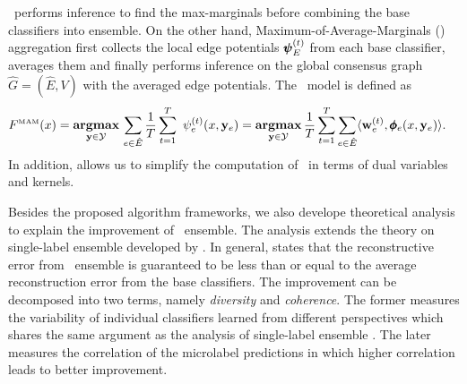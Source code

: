 {%
\amm\ performs inference to find the max-marginals before combining the base classifiers into ensemble. 
On the other hand, Maximum-of-Average-Marginals (\mam) aggregation first collects the local edge potentials $\pmb \psi_E^{(t)}$ from each base classifier, averages them and finally performs inference on the global consensus graph $\hat{G}=(\hat{E},V)$ with the averaged edge potentials.
The \mam\ model is defined as
\begin{align*}
	F^{\text{\tiny MAM}}(x) &= \underset{\vy \in \Ycal }{\argmax}\,\sum_{e\in \hat{E}}\frac{1}{T}\sum_{t=1}^{T}\ \psi^{(t)}_e(x,\vy_e)
	= \underset{\vy \in \Ycal}{\argmax}\, \frac{1}{T} \sum_{t=1}^T \sum_{e\in \hat{E}} \ip{\vw_e^{(t)}}{\phib_e(x,\vy_e)}. %
\end{align*}
In addition,  allows us to simplify the computation of \mam\ in terms of dual variables and kernels.

Besides the proposed algorithm frameworks, we also develope theoretical analysis to explain the improvement of \mam\ ensemble.
The analysis extends the theory on single-label ensemble developed by \citet{Brown10good}.
In general,  states that the reconstructive error from \mam\ ensemble is guaranteed to be less than or equal to the average reconstruction error from the base classifiers.
The improvement can be decomposed into two terms, namely \textit{diversity} and \textit{coherence}.
The former measures the variability of individual classifiers learned from different perspectives which shares the same argument as the analysis of single-label ensemble \citep{Brown10good}.
The later measures the correlation of the microlabel predictions in which higher correlation leads to better improvement.



}
